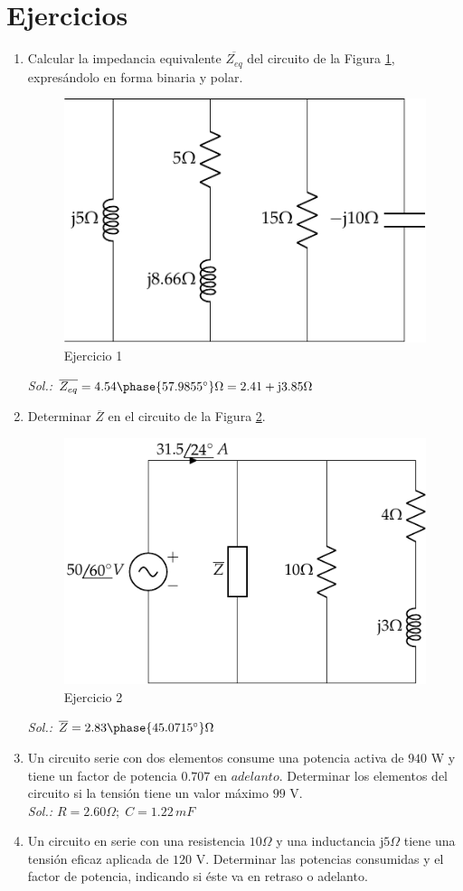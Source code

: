 \section{Ejercicios}
	
	\begin{enumerate}
		
\item Calcular la impedancia equivalente $\overline{Z_{eq}}$ del circuito de la Figura \ref{fig.ej_CA1}, expresándolo en forma binaria y polar.
 \begin{figure}[H]
        \centering
        \includegraphics[width=0.35\linewidth]{../figs/ej1_BT2.pdf}
        \caption{Ejercicio 1}
        \label{fig.ej_CA1}
    \end{figure}
    \emph{Sol.: $\overline{Z_{eq}}=4.54\phase{57.9855^\circ}\Omega=2.41+\mathrm{j}3.85\Omega$}
    \item Determinar $\overline{Z}$ en el circuito de la Figura \ref{fig.ej_CA2}.
     \begin{figure}[H]
        \centering
        \includegraphics[width=0.5\linewidth]{../figs/ej2_BT2.pdf}
        \caption{Ejercicio 2}
        \label{fig.ej_CA2}
    \end{figure}
    \emph{Sol.: $\overline{Z}=2.83\phase{45.0715^\circ}\Omega$}
    \item Un circuito serie con dos elementos consume una potencia activa de $940$ W y tiene un factor de potencia $0.707$ en $adelanto$. Determinar los elementos del circuito si la tensión tiene un valor máximo $99$ V. \\
    \emph{Sol.: $R=2.60\Omega;\;C=1.22\,mF$}
    \item Un circuito en serie con una resistencia $10\Omega$ y una inductancia $\mathrm{j}5\Omega$ tiene una tensión eficaz aplicada de $120$ V. Determinar las potencias consumidas y el factor de potencia, indicando si éste va en retraso o adelanto. \\

\end{enumerate}
